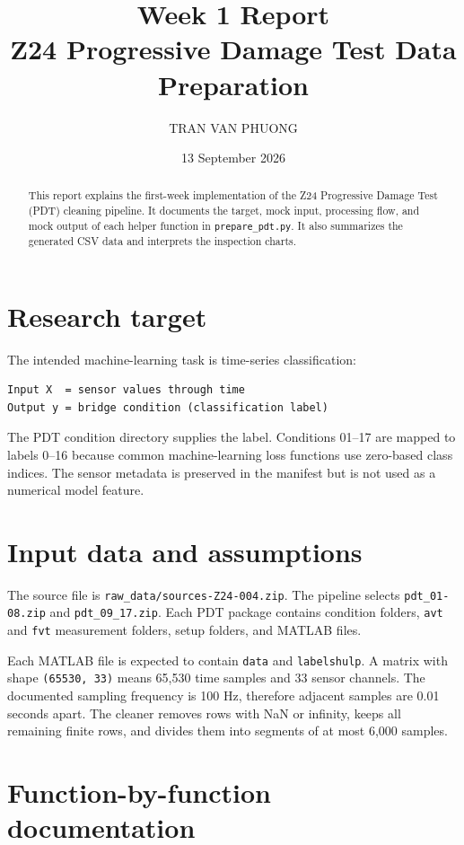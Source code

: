 \documentclass[11pt,a4paper]{article}
\title{\textbf{Week 1 Report}\\[0.4em]Z24 Progressive Damage Test Data Preparation}
\author{TRAN VAN PHUONG}
\date{13 September 2026}
\begin{document}
\maketitle

\begin{abstract}
This report explains the first-week implementation of the Z24 Progressive Damage Test (PDT) cleaning pipeline. It documents the target, mock input, processing flow, and mock output of each helper function in \texttt{prepare\_pdt.py}. It also summarizes the generated CSV data and interprets the inspection charts.
\end{abstract}

\section{Research target}
The intended machine-learning task is time-series classification:

\begin{lstlisting}
Input X  = sensor values through time
Output y = bridge condition (classification label)
\end{lstlisting}

The PDT condition directory supplies the label. Conditions 01--17 are mapped to labels 0--16 because common machine-learning loss functions use zero-based class indices. The sensor metadata is preserved in the manifest but is not used as a numerical model feature.

\section{Input data and assumptions}
The source file is \texttt{raw\_data/sources-Z24-004.zip}. The pipeline selects \texttt{pdt\_01-08.zip} and \texttt{pdt\_09\_17.zip}. Each PDT package contains condition folders, \texttt{avt} and \texttt{fvt} measurement folders, setup folders, and MATLAB files.

Each MATLAB file is expected to contain \texttt{data} and \texttt{labelshulp}. A matrix with shape \texttt{(65530, 33)} means 65,530 time samples and 33 sensor channels. The documented sampling frequency is 100 Hz, therefore adjacent samples are 0.01 seconds apart. The cleaner removes rows with NaN or infinity, keeps all remaining finite rows, and divides them into segments of at most 6,000 samples.

\section{Function-by-function documentation}
\end{document}
